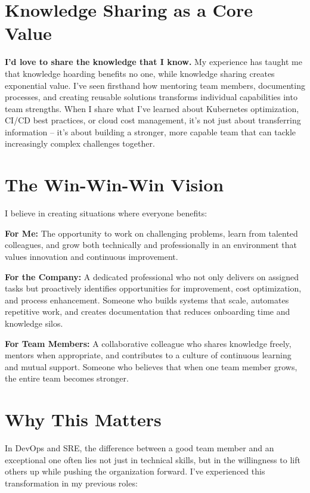 \documentclass[11pt,a4paper]{article}
\begin{document}
\section{Knowledge Sharing as a Core Value}

\textbf{I'd love to share the knowledge that I know.} My experience has taught me that knowledge hoarding benefits no one, while knowledge sharing creates exponential value. I've seen firsthand how mentoring team members, documenting processes, and creating reusable solutions transforms individual capabilities into team strengths. When I share what I've learned about Kubernetes optimization, CI/CD best practices, or cloud cost management, it's not just about transferring information – it's about building a stronger, more capable team that can tackle increasingly complex challenges together.

\section{The Win-Win-Win Vision}

I believe in creating situations where everyone benefits:

\textbf{For Me:} The opportunity to work on challenging problems, learn from talented colleagues, and grow both technically and professionally in an environment that values innovation and continuous improvement.

\textbf{For the Company:} A dedicated professional who not only delivers on assigned tasks but proactively identifies opportunities for improvement, cost optimization, and process enhancement. Someone who builds systems that scale, automates repetitive work, and creates documentation that reduces onboarding time and knowledge silos.

\textbf{For Team Members:} A collaborative colleague who shares knowledge freely, mentors when appropriate, and contributes to a culture of continuous learning and mutual support. Someone who believes that when one team member grows, the entire team becomes stronger.

\section{Why This Matters}

In DevOps and SRE, the difference between a good team member and an exceptional one often lies not just in technical skills, but in the willingness to lift others up while pushing the organization forward. I've experienced this transformation in my previous roles:
\end{document}
